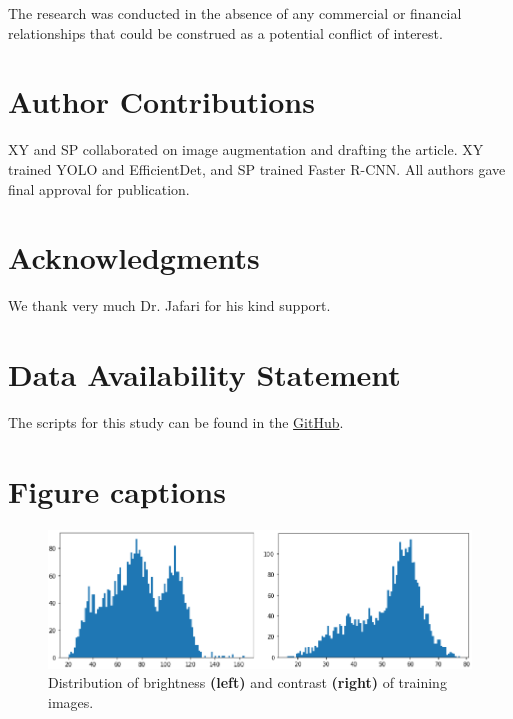 \documentclass[utf8]{frontiersSCNS} %
\begin{document}
The research was conducted in the absence of any commercial or financial relationships that could be construed as a potential conflict of interest.

\section*{Author Contributions}

XY and SP collaborated on image augmentation and drafting the article. XY trained YOLO and EfficientDet, and SP trained Faster R-CNN. All authors gave final approval for publication.

\section*{Acknowledgments}
We thank very much Dr. Jafari for his kind support.

\section*{Data Availability Statement}
The scripts for this study can be found in the \href{https://github.com/xinyuyao22/Global-Wheat-Detection}{GitHub}.



\section*{Figure captions}

\begin{figure}[H]
\centering
\includegraphics[width=12cm]{figures/fig01-combined.eps}
\caption{Distribution of brightness \textbf{(left)} and contrast \textbf{(right)} of training images.}\label{fig:1}
\end{figure}
\end{document}
